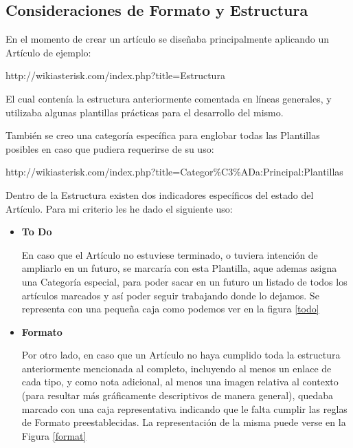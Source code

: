  \subsection{Consideraciones de Formato y Estructura}

 En el momento de crear un artículo se diseñaba principalmente aplicando un Artículo de ejemplo:

 http://wikiasterisk.com/index.php?title=Estructura

 El cual contenía la estructura anteriormente comentada en líneas generales, y utilizaba algunas plantillas prácticas para el desarrollo del mismo.

 También se creo una categoría específica para englobar todas las Plantillas posibles en caso que pudiera requerirse de su uso: 

 http://wikiasterisk.com/index.php?title=Categor\%C3\%ADa:Principal:Plantillas

 Dentro de la Estructura existen dos indicadores específicos del estado del Artículo. Para mi criterio les he dado el siguiente uso:

 \begin{itemize}
	  \setlength{\itemsep}{10pt}

 \item \textbf{To Do}
 
 En caso que el Artículo no estuviese terminado, o tuviera intención de ampliarlo en un futuro, se marcaría con esta Plantilla, aque ademas asigna una Categoría especial, para poder sacar en un futuro un listado de todos los artículos marcados y así poder seguir trabajando donde lo dejamos. Se representa con una pequeña caja como podemos ver en la figura \ref{todo}


\item \textbf{Formato}

Por otro lado, en caso que un Artículo no haya cumplido toda la estructura anteriormente mencionada al completo, incluyendo al menos un enlace de cada tipo, y como nota adicional, al menos una imagen relativa al contexto (para resultar más gráficamente descriptivos de manera general), quedaba marcado con una caja representativa indicando que le falta cumplir las reglas de Formato preestablecidas. La representación de la misma puede verse en la Figura \ref{format}


\end{itemize}